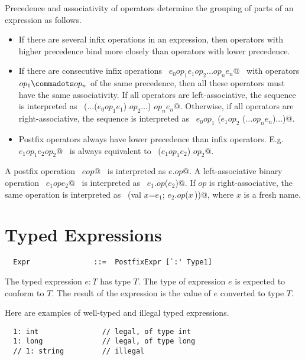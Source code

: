 \documentclass[a4paper,12pt,twoside,titlepage]{book}
\begin{document}
Precedence and associativity of operators determine the grouping of
parts of an expression as follows.
\begin{itemize}
\item If there are several infix operations in an
expression, then operators with higher precedence bind more closely
than operators with lower precedence.
\item If there are consecutive infix
operations ~\lstinline@$e_0 op_1 e_1 op_2 \ldots op_n e_n$@~ 
with operators $op_1 \commadots op_n$ of the same precedence, 
then all these operators must
have the same associativity. If all operators are left-associative,
the sequence is interpreted as
~\lstinline@($\ldots$($e_0 op_1 e_1$) $op_2 \ldots$) $op_n e_n$@. 
Otherwise, if all operators are right-associative, the
sequence is interpreted as
~\lstinline@$e_0 op_1$ ($e_1 op_2$ ($\ldots op_n e_n$)$\ldots$)@.
\item
Postfix operators always have lower precedence than infix
operators. E.g.~\lstinline@$e_1 op_1 e_2 op_2$@~ is always equivalent to
~\lstinline@($e_1 op_1 e_2$) $op_2$@.
\end{itemize}
A postfix operation ~\lstinline@$e op$@~ is interpreted as \lstinline@$e$.$op$@. A
left-associative binary operation ~\lstinline@$e_1 op e_2$@~ is interpreted as
~\lstinline@$e_1$.$op$($e_2$)@. If $op$ is right-associative, the same operation is
interpreted as ~\lstinline@(val $x$=$e_1$; $e_2$.$op$($x\,$))@, 
where $x$ is a fresh name.

\section{Typed Expressions}

\syntax\begin{lstlisting}
  Expr               ::=  PostfixExpr [`:' Type1]
\end{lstlisting}

The typed expression $e: T$ has type $T$. The type of
expression $e$ is expected to conform to $T$. The result of
the expression is the value of $e$ converted to type $T$.

\example Here are examples of well-typed and illegal typed expressions.

\begin{lstlisting}
  1: int               // legal, of type int
  1: long              // legal, of type long
  // 1: string         // illegal
\end{lstlisting}
\end{document}
